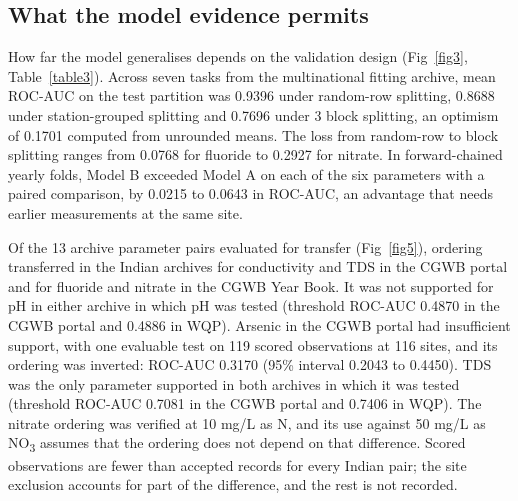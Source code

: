 \documentclass[10pt,letterpaper]{article}
\begin{document}
\subsection*{What the model evidence permits}

How far the model generalises depends on the validation design (Fig~\ref{fig3}, Table~\ref{table3}). Across seven tasks from the multinational fitting archive, mean ROC-AUC on the test partition was 0.9396 under random-row splitting, 0.8688 under station-grouped splitting and 0.7696 under 3\textdegree{} block splitting, an optimism of 0.1701 computed from unrounded means. The loss from random-row to block splitting ranges from 0.0768 for fluoride to 0.2927 for nitrate. In forward-chained yearly folds, Model B exceeded Model A on each of the six parameters with a paired comparison, by 0.0215 to 0.0643 in ROC-AUC, an advantage that needs earlier measurements at the same site.

Of the 13 archive \texttimes{} parameter pairs evaluated for transfer (Fig~\ref{fig5}), ordering transferred in the Indian archives for conductivity and TDS in the CGWB portal and for fluoride and nitrate in the CGWB Year Book. It was not supported for pH in either archive in which pH was tested (threshold ROC-AUC 0.4870 in the CGWB portal and 0.4886 in WQP). Arsenic in the CGWB portal had insufficient support, with one evaluable test on 119 scored observations at 116 sites, and its ordering was inverted: ROC-AUC 0.3170 (95\% interval 0.2043 to 0.4450). TDS was the only parameter supported in both archives in which it was tested (threshold ROC-AUC 0.7081 in the CGWB portal and 0.7406 in WQP). The nitrate ordering was verified at 10 mg/L as N, and its use against 50 mg/L as NO\textsubscript{3} assumes that the ordering does not depend on that difference. Scored observations are fewer than accepted records for every Indian pair; the site exclusion accounts for part of the difference, and the rest is not recorded.
\end{document}
